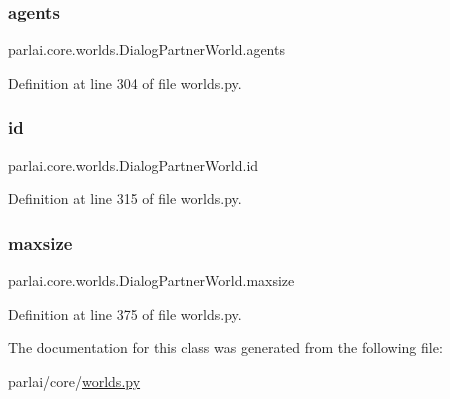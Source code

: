 \subsubsection{\texorpdfstring{agents}{agents}}
{\footnotesize\ttfamily parlai.\+core.\+worlds.\+Dialog\+Partner\+World.\+agents}



Definition at line 304 of file worlds.\+py.

\mbox{\label{classparlai_1_1core_1_1worlds_1_1DialogPartnerWorld_a7b3dc60816b628d1e358521b23d50e2c}} 
\subsubsection{\texorpdfstring{id}{id}}
{\footnotesize\ttfamily parlai.\+core.\+worlds.\+Dialog\+Partner\+World.\+id}



Definition at line 315 of file worlds.\+py.

\mbox{\label{classparlai_1_1core_1_1worlds_1_1DialogPartnerWorld_acae28d33fb7d494b7df84d0f8c57eb23}} 
\subsubsection{\texorpdfstring{maxsize}{maxsize}}
{\footnotesize\ttfamily parlai.\+core.\+worlds.\+Dialog\+Partner\+World.\+maxsize\hspace{0.3cm}{\ttfamily [static]}}



Definition at line 375 of file worlds.\+py.



The documentation for this class was generated from the following file\+:\begin{DoxyCompactItemize}
\item 
parlai/core/\hyperlink{parlai_2core_2worlds_8py}{worlds.\+py}\end{DoxyCompactItemize}
